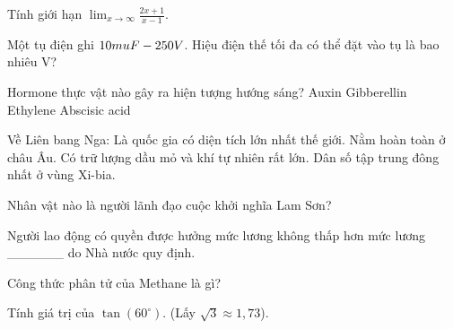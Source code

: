 \begin{ex}
    Tính giới hạn $\lim_{x \to \infty} \frac{2x+1}{x-1}$.
\end{ex}

\begin{ex}
    Một tụ điện ghi $10 \\mu F - 250V$. Hiệu điện thế tối đa có thể đặt vào tụ là bao nhiêu V?
\end{ex}

\begin{ex}
    Hormone thực vật nào gây ra hiện tượng hướng sáng?
    \choice
    {\True Auxin}
    {Gibberellin}
    {Ethylene}
    {Abscisic acid}
\end{ex}

\begin{ex}
    Về Liên bang Nga:
    \choiceTF
    {\True Là quốc gia có diện tích lớn nhất thế giới.}
    {Nằm hoàn toàn ở châu Âu.}
    {\True Có trữ lượng dầu mỏ và khí tự nhiên rất lớn.}
    {Dân số tập trung đông nhất ở vùng Xi-bia.}
\end{ex}

\begin{ex}
    Nhân vật nào là người lãnh đạo cuộc khởi nghĩa Lam Sơn?

\end{ex}

\begin{ex}
    Người lao động có quyền được hưởng mức lương không thấp hơn mức lương ______ do Nhà nước quy định.

\end{ex}

\begin{ex}
    Công thức phân tử của Methane là gì?
\end{ex}

\begin{ex}
    Tính giá trị của $\tan(60^\circ)$. (Lấy $\sqrt{3} \approx 1,73$).
\end{ex}


